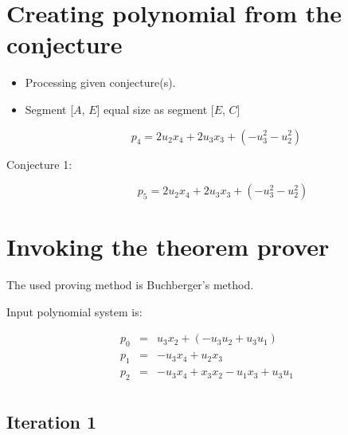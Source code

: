 \documentclass[a4paper]{article}
\begin{document}
\section{Creating polynomial from the conjecture}

\begin{itemize}

\item Processing given conjecture(s).

\item 
 Segment [$A$, $E$] equal size as segment [$E$, $C$]

$$
p_{4}  =  2u_{2}x_{4}+2u_{3}x_{3}+(-u_{3}^{2}-u_{2}^{2})
$$
\end{itemize}

\begin{description}

\item [Conjecture 1:] $$
p_{5}  =  2u_{2}x_{4}+2u_{3}x_{3}+(-u_{3}^{2}-u_{2}^{2})
$$
\end{description}





\section{Invoking the theorem prover}

The used proving method is Buchberger's method.

Input polynomial system is:

\begin{eqnarray*}
p_{0} &=& u_{3}x_{2}+(-u_{3}u_{2}+u_{3}u_{1})\\
p_{1} &=& -u_{3}x_{4}+u_{2}x_{3}\\
p_{2} &=& -u_{3}x_{4}+x_{3}x_{2}-u_{1}x_{3}+u_{3}u_{1}\\
\end{eqnarray*}




\subsection{Iteration 1}
\end{document}
